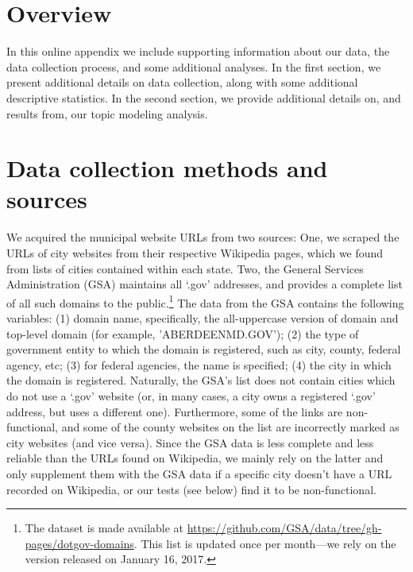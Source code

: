 \documentclass[11pt]{article}
\begin{document}
\section{Overview}

In this online appendix we include supporting information about our data, the data collection process, and some additional analyses. In the first section, we present additional details on data collection, along with some additional descriptive statistics. In the second section, we provide additional details on, and results from, our topic modeling analysis.

\section{Data collection methods and sources}

We acquired the municipal website URLs from two sources: One, we scraped the URLs of city websites from their respective Wikipedia pages, which we found from lists of cities contained within each state. Two, the General Services Administration (GSA) maintains all `.gov' addresses, and provides a complete list of all such domains to the public.\footnote{The dataset is made available at \url{https://github.com/GSA/data/tree/gh-pages/dotgov-domains}. This list is updated once per month---we rely on the version released on January 16, 2017.} The data from the GSA contains the following variables: (1) domain name, specifically, the all-uppercase version of domain and top-level domain (for example, 'ABERDEENMD.GOV'); (2) the type of government entity to which the domain is registered, such as city, county, federal agency, etc; (3) for federal agencies, the name is specified; (4) the city in which the domain is registered. Naturally, the GSA's list does not contain cities which do not use a `.gov' website (or, in many cases, a city owns a registered `.gov' address, but uses a different one). Furthermore, some of the links are non-functional, and some of the county websites on the list are incorrectly marked as city websites (and vice versa). Since the GSA data is less complete and less reliable than the URLs found on Wikipedia, we mainly rely on the latter and only supplement them with the GSA data if a specific city doesn't have a URL recorded on Wikipedia, or our tests (see below) find it to be non-functional.
\end{document}
